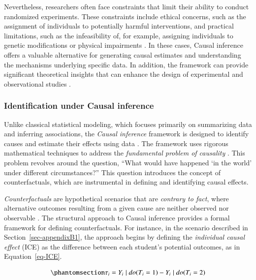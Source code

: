 \documentclass[
  authoryear,
  review,
  1p]{elsarticle}
\begin{document}
Nevertheless, researchers often face constraints that limit their
ability to conduct randomized experiments. These constraints include
ethical concerns, such as the assignment of individuals to potentially
harmful interventions, and practical limitations, such as the
infeasibility of, for example, assigning individuals to genetic
modifications or physical impairments \citep{Neal_2020}. In these cases,
Causal inference offers a valuable alternative for generating causal
estimates and understanding the mechanisms underlying specific data. In
addition, the framework can provide significant theoretical insights
that can enhance the design of experimental and observational studies
\citep{McElreath_2020}.

\subsubsection{Identification under Causal
inference}\label{sec-appendixB2}

Unlike classical statistical modeling, which focuses primarily on
summarizing data and inferring associations, the \emph{Causal inference}
framework is designed to identify causes and estimate their effects
using data \citep{Shaughnessy_et_al_2010, Neal_2020}. The framework uses
rigorous mathematical techniques to address the \emph{fundamental
problem of causality}
\citep{Pearl_2009, Pearl_et_al_2016, Morgan_et_al_2014}. This problem
revolves around the question, ``What would have happened `in the world'
under different circumstances?'' This question introduces the concept of
counterfactuals, which are instrumental in defining and identifying
causal effects.

\emph{Counterfactuals} are hypothetical scenarios that are
\emph{contrary to fact}, where alternative outcomes resulting from a
given cause are neither observed nor observable
\citep{Neal_2020, Counterfactual_2024}. The structural approach to
Causal inference \citep{Pearl_2009, Pearl_et_al_2016} provides a formal
framework for defining counterfactuals. For instance, in the scenario
described in Section~\ref{sec-appendixB1}, the approach begins by
defining the \emph{individual causal effect} (ICE) as the difference
between each student's potential outcomes, as in Equation~\ref{eq-ICE}.

\begin{equation}\protect\phantomsection\label{eq-ICE}{
\tau_{i} = Y_{i} \mid do(T_{i}=1) - Y_{i} \mid do(T_{i}=2)
}\end{equation}
\end{document}
